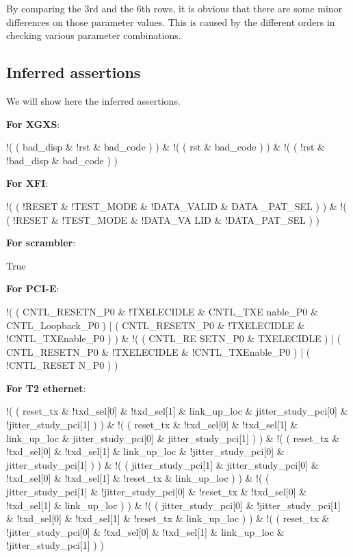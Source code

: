 \documentclass{sig-alternate}
\begin{document}
By comparing the 3rd and the 6th rows,
it is obvious that there are some minor differences on those parameter values.
This is caused by the different orders in checking various parameter combinations.

\subsection{Inferred assertions}
We will show here the inferred assertions.

\textbf{For XGXS}:

!( ( bad\_disp \& !rst \& bad\_code ) ) \& !( ( rst \& bad\_code ) ) \& !( ( !rst \& !bad\_disp \& bad\_code ) )
 
\textbf{For XFI}:

!( ( !RESET \& !TEST\_MODE \& !DATA\_VALID \& DATA \_PAT\_SEL ) ) \& !( ( !RESET \& !TEST\_MODE \& !DATA\_VA LID \& !DATA\_PAT\_SEL ) )

\textbf{For scrambler}:

True

\textbf{For PCI-E}:

!( ( CNTL\_RESETN\_P0 \& !TXELECIDLE \& CNTL\_TXE nable\_P0 \& CNTL\_Loopback\_P0 ) | ( CNTL\_RESETN\_P0 \& !TXELECIDLE \& !CNTL\_TXEnable\_P0 ) ) \& !( ( CNTL\_RE SETN\_P0 \& TXELECIDLE ) | ( CNTL\_RESETN\_P0 \& !TXELECIDLE \& !CNTL\_TXEnable\_P0 ) | ( !CNTL\_RESET N\_P0 ) )

\textbf{For T2 ethernet}:

!( ( reset\_tx \& !txd\_sel[0] \& !txd\_sel[1] \& link\_up\_loc \& jitter\_study\_pci[0] \& !jitter\_study\_pci[1] ) ) \& !( ( reset\_tx \& !txd\_sel[0] \& !txd\_sel[1] \& link\_up\_loc \& jitter\_study\_pci[0] \& jitter\_study\_pci[1] ) ) \& !( ( reset\_tx \& !txd\_sel[0] \& !txd\_sel[1] \& link\_up\_loc \& !jitter\_study\_pci[0] \& jitter\_study\_pci[1] ) ) \& !( ( jitter\_study\_pci[1] \& jitter\_study\_pci[0] \& !txd\_sel[0] \& !txd\_sel[1] \& !reset\_tx \& link\_up\_loc ) ) \& !( ( jitter\_study\_pci[1] \& !jitter\_study\_pci[0] \& !reset\_tx \& !txd\_sel[0] \& !txd\_sel[1] \& link\_up\_loc ) ) \& !( ( jitter\_study\_pci[0] \& !jitter\_study\_pci[1] \& !txd\_sel[0] \& !txd\_sel[1] \& !reset\_tx \& link\_up\_loc ) ) \& !( ( reset\_tx \& !jitter\_study\_pci[0] \& !txd\_sel[0] \& !txd\_sel[1] \& link\_up\_loc \& !jitter\_study\_pci[1] ) )

\end{document}
